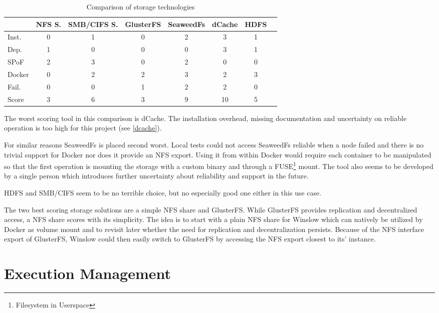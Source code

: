 \begin{table}[H]
	\begin{tabular}{l|c|c|c|c|c|c|c}
				& NFS S.& SMB/CIFS S.& GlusterFS & SeaweedFs	& dCache 	& HDFS \\
		\hline
		Inst. 	& 0 	& 1 		& 0 		& 2 		& 3			& 1 \\
		Dep. 	& 1 	& 0			& 0 		& 0 		& 3 		& 1 \\
		SPoF 	& 2		& 3			& 0			& 2 		& 0			& 0 \\
		Docker 	& 0 	& 2 		& 2 		& 3 		& 2 		& 3 \\
		Fail.	& 0		& 0			& 1			& 2			& 2			& 0 \\
		\hline
		Score 	& 3		& 6			& 3			& 9			& 10		& 5 \\
	\end{tabular}
	\caption{Comparison of storage technologies}
	\label{comparision:storage}
\end{table}

The worst scoring tool in this comparison is dCache.
The installation overhead, missing documentation and uncertainty on reliable operation is too high for this project (see \autoref{dcache}).

For similar reasons SeaweedFs is placed second worst.
Local tests could not access SeaweedFs reliable when a node failed and there is no trivial support for Docker nor does it provide an NFS export.
Using it from within Docker would require each container to be manipulated so that the first operation is mounting the storage with a custom binary and through a FUSE\footnote{Filesystem in Userspace} mount.
The tool also seems to be developed by a single person which introduces further uncertainty about reliability and support in the future.

HDFS and SMB/CIFS seem to be no terrible choice, but no especially good one either in this use case.

The two best scoring storage solutions are a simple NFS share and GlusterFS.
While GlusterFS provides replication and decentralized access, a NFS share scores with its simplicity.
The idea is to start with a plain NFS share for Winslow which can natively be utilized by Docker as volume mount and to revisit later whether the need for replication and decentralization persists.
Because of the NFS interface export of GlusterFS, Winslow could then easily switch to GlusterFS by accessing the NFS export closest to its' instance.



\section{Execution Management}

